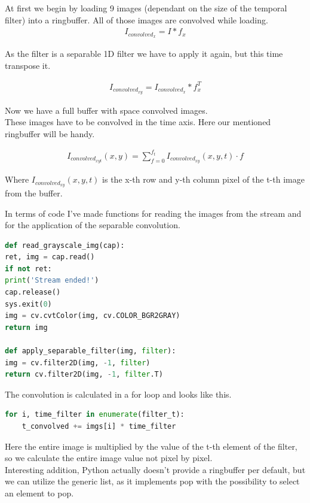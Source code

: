 \documentclass[UTF-8]{article}
\begin{document}
At first we begin by loading 9 images (dependant on the size of the temporal filter) into a ringbuffer. All of those images are convolved while loading.\\
\begin{align}
	I_{convolved_x} = I * f_x
\end{align}

As the filter is a separable 1D filter we have to apply it again, but this time transpose it.

\begin{align}
	I_{convolved_{xy}} = I_{convolved_x} * f_x^T
\end{align}

Now we have a full buffer with space convolved images.\\
These images have to be convolved in the time axis. Here our mentioned ringbuffer will be handy.

\begin{align}
	I_{convolved_{xyt}}(x,y) = \sum_{f = 0}^{f_t} I_{convolved_{xy}}(x,y,t) \cdot f
\end{align}

Where $I_{convolved_{xy}}(x,y,t)$ is the x-th row and y-th column pixel of the t-th image from the buffer.


In terms of code I've made functions for reading the images from the stream and for the application of the separable convolution.

\begin{lstlisting}[language=python]
def read_grayscale_img(cap):
ret, img = cap.read()
if not ret:
print('Stream ended!')
cap.release()
sys.exit(0)
img = cv.cvtColor(img, cv.COLOR_BGR2GRAY)
return img

def apply_separable_filter(img, filter):
img = cv.filter2D(img, -1, filter)
return cv.filter2D(img, -1, filter.T)
\end{lstlisting}

The convolution is calculated in a for loop and looks like this.

\begin{lstlisting}[language=python]
for i, time_filter in enumerate(filter_t):
	t_convolved += imgs[i] * time_filter
\end{lstlisting}

Here the entire image is multiplied by the value of the t-th element of the filter, so we calculate the entire image value not pixel by pixel.\\
Interesting addition, Python actually doesn't provide a ringbuffer per default, but we can utilize the generic list, as it implements pop with the possibility to select an element to pop.
\\
\end{document}
